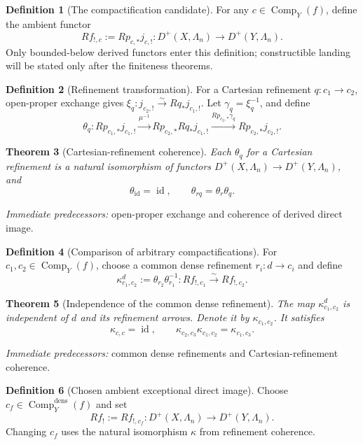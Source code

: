 \documentclass[10pt]{article}
\newtheorem{theorem}{Theorem}[section]
\theoremstyle{definition}
\newtheorem{definition}[theorem]{Definition}
\newcommand{\Comp}{\operatorname{Comp}}
\newcommand{\pred}[1]{\par\smallskip\begingroup\footnotesize\raggedright
\emph{Immediate predecessors:} #1.\par\endgroup}
\begin{document}
\begin{definition}[The compactification candidate]
For any \(c\in\Comp_Y(f)\), define the ambient functor
\[
 Rf_{!,c}:=Rp_{c,*}j_{c,!}:
 D^+(X,\Lambda_n)\longrightarrow D^+(Y,\Lambda_n).
\]
Only bounded-below derived functors enter this definition; constructible
landing will be stated only after the finiteness theorems.
\end{definition}

\begin{definition}[Refinement transformation]
For a Cartesian refinement \(q:c_1\to c_2\), open-proper exchange gives
\(\xi_q:j_{c_2,!}\xrightarrow{\sim}Rq_*j_{c_1,!}\).
Let \(\gamma_q=\xi_q^{-1}\), and define
\[
 \theta_q:
 Rp_{c_1,*}j_{c_1,!}
 \xrightarrow{\mu^{-1}}
 Rp_{c_2,*}Rq_*j_{c_1,!}
 \xrightarrow{Rp_{c_2,*}\gamma_q}
 Rp_{c_2,*}j_{c_2,!}.
\]
\end{definition}

\begin{theorem}[Cartesian-refinement coherence]
Each \(\theta_q\) for a Cartesian refinement is a natural isomorphism of functors
\(D^+(X,\Lambda_n)\to D^+(Y,\Lambda_n)\), and
\[
 \theta_{\operatorname{id}}=\operatorname{id},\qquad
 \theta_{rq}=\theta_r\theta_q.
\]
\end{theorem}
\pred{open-proper exchange and coherence of derived direct image}

\begin{definition}[Comparison of arbitrary compactifications]
For \(c_1,c_2\in\Comp_Y(f)\), choose a common dense refinement
\(r_i:d\to c_i\) and define
\[
 \kappa^d_{c_1,c_2}:=
 \theta_{r_2}\theta_{r_1}^{-1}:
 Rf_{!,c_1}\xrightarrow{\sim}Rf_{!,c_2}.
\]
\end{definition}

\begin{theorem}[Independence of the common dense refinement]
The map \(\kappa^d_{c_1,c_2}\) is independent of \(d\) and its refinement
arrows.  Denote it by \(\kappa_{c_1,c_2}\).  It satisfies
\[
 \kappa_{c,c}=\operatorname{id},\qquad
 \kappa_{c_2,c_3}\kappa_{c_1,c_2}=\kappa_{c_1,c_3}.
\]
\end{theorem}
\pred{common dense refinements and Cartesian-refinement coherence}

\begin{definition}[Chosen ambient exceptional direct image]
Choose \(c_f\in\Comp_Y^{\mathrm{dens}}(f)\) and set
\[
 Rf_!:=Rf_{!,c_f}:
 D^+(X,\Lambda_n)\longrightarrow D^+(Y,\Lambda_n).
\]
Changing \(c_f\) uses the natural isomorphism \(\kappa\) from refinement
coherence.
\end{definition}
\end{document}
